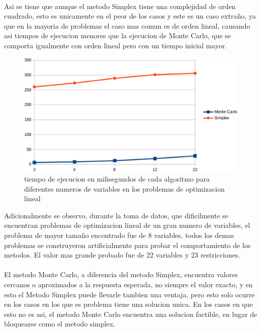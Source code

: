 \documentclass[runningheads]{llncs}
\begin{document}
\paragraph{}
Asi se tiene que aunque el metodo Simplex tiene una complejidad de orden cuadrado, esto es unicamente en el peor de los casos y este es un caso extraño, ya que en la mayoria de problemas el caso mas comun es de orden lineal, causando asi tiempos de ejecucion menores que la ejecucion de Monte Carlo, que se comporta igualmente con orden lineal pero con un tiempo inicial mayor.

\begin{figure}
\includegraphics[width=\textwidth]{fig1.eps}
\caption{tiempo de ejecucion en milisegundos de cada algoritmo para diferentes numeros de variables en los problemas de optimizacion lineal} \label{fig1}
\end{figure}

Adicionalmente se observo, durante la toma de datos, que dificilmente se encuentran problemas de optimizacion lineal de un gran numero de variables, el problema de mayor tamaño encontrado fue de 8 variables, todos los demas problemas se construyeron artificialmente para probar el comportamiento de los metodos. El valor mas grande probado fue de 22 variables y 23 restricciones. 
\paragraph{}
El metodo Monte Carlo, a diferencia del metodo Simplex, encuentra valores cercanos o aproximados a la respuesta esperada, no siempre el valor exacto, y en esto el Metodo Simplex puede llevarle tambien una ventaja, pero esto solo ocurre en los casos en los que es problema tiene una solucion unica. En los casos en que esto no es asi, el metodo Monte Carlo encuentra una solucion factible, en lugar de bloquearse como el metodo simplex.  
\end{document}
